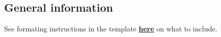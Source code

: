 \subsection*{General information}

See formating instructions in the template \href{https://github.com/MansMeg/BSDA/tree/main/templates}{\textbf{here}} on what to include.

